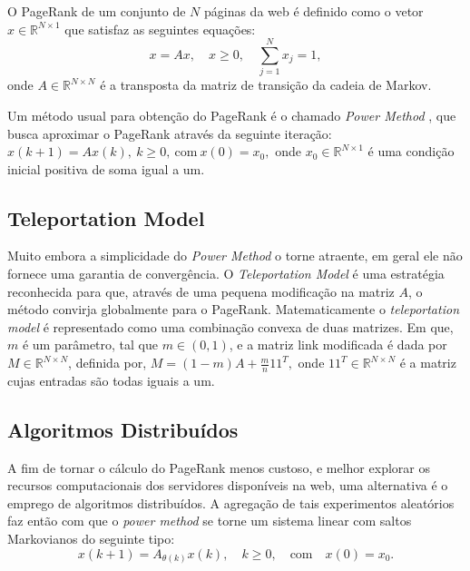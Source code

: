 \documentclass[a0,portrait]{a0poster}
\begin{document}
\begin{multicols}{2}
O PageRank de um conjunto de $N$ p\'aginas da web \'e definido como o vetor $x \in \mathbb{R}^{N \times 1}$ que satisfaz as seguintes equa\c{c}\~oes:
%
\begin{equation}	
	x = Ax, \quad x\geq0, \quad \sum^{N}_{j=1} x_{j} = 1, 
\end{equation}
%
onde $A \in \mathbb{R}^{N \times N}$ \'e a transposta da matriz de transi\c{c}\~ao da cadeia de Markov.

Um m\'etodo usual para obten\c{c}\~ao do PageRank \'e o chamado \textit{Power Method} \cite{ishiiMag14}, que busca aproximar o PageRank atrav\'es da seguinte itera\c{c}\~ao: $x(k+1) = Ax(k),\: k\geq0,\: \text{com} \: x(0) = x_0,$ onde $x_0 \in \mathbb{R}^{N \times 1}$ \'e uma condi\c{c}\~ao inicial positiva de soma igual a um.\\[-2em]

\subsection{Teleportation Model}

Muito embora a simplicidade do \textit{Power Method} o torne atraente, em geral ele n\~ao fornece uma garantia de converg\^encia. O \textit{Teleportation Model} \'e uma estrat\'egia reconhecida para que, atrav\'es de uma pequena modifica\c{c}\~ao na matriz $A$, o m\'etodo convirja globalmente para o PageRank. Matematicamente o \textit{teleportation model} \'e representado como uma combina\c{c}\~ao convexa de duas matrizes. Em que, $m$ \'e um par\^ametro, tal que $m \in (0,1)$, e a matriz link modificada \'e dada por $M \in \mathbb{R}^{N \times N}$, definida por, $M = (1-m)A + \frac{m}{n} 11^T,$ onde $11^T \in \mathbb{R}^{N \times N}$ \'e a matriz cujas entradas s\~ao todas iguais a um.\\[-2em]

\subsection{Algoritmos Distribu\'idos}

A fim de tornar o c\'alculo do PageRank menos custoso, e melhor explorar os recursos computacionais dos servidores dispon\'iveis na web, uma alternativa \'e o emprego de algoritmos distribu\'idos. A agrega\c{c}\~ao de tais experimentos aleat\'orios faz ent\~ao com que o \textit{power method} se torne um sistema linear com saltos Markovianos do seguinte tipo:
%
\begin{equation}
	x(k+1) = A_{\theta(k)}x(k), \quad k\geq0, \quad \text{com} \quad x(0) = x_0. 
\end{equation}


\end{multicols}
\end{document}
